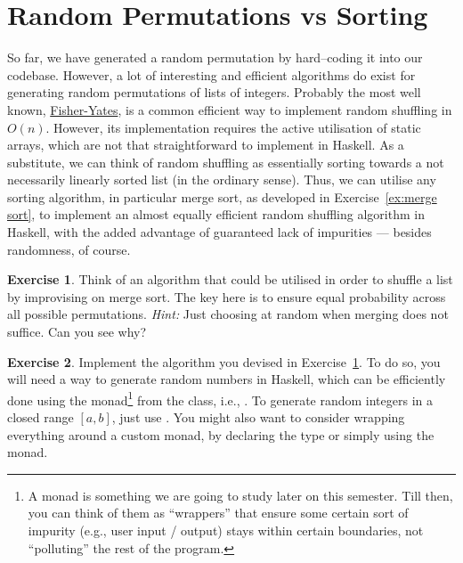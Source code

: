 \documentclass[a4paper]{tufte-handout}
\theoremstyle{definition}
\newtheorem{exercise}{Exercise}
\begin{document}
	\section{Random Permutations vs Sorting}
	So far, we have generated a random permutation by hard--coding it into our codebase. However, a lot of interesting and efficient algorithms do exist for generating random permutations of lists of integers. Probably the most well known, \href{https://en.wikipedia.org/wiki/Fisher%E2%80%93Yates_shuffle}{Fisher-Yates}, is a common efficient way to implement random shuffling in $O(n)$. However, its implementation requires the active utilisation of static arrays, which are not that straightforward to implement in Haskell. As a substitute, we can think of random shuffling as essentially sorting towards a not necessarily linearly sorted list (in the ordinary sense). Thus, we can utilise any sorting algorithm, in particular merge sort, as developed in Exercise~\ref{ex:merge sort}, to implement an almost equally efficient random shuffling algorithm in Haskell, with the added advantage of guaranteed lack of impurities --- besides randomness, of course.
	
	\begin{exercise}\label{ex:merge shuffle}
		Think of an algorithm that could be utilised in order to shuffle a list by improvising on merge sort. The key here is to ensure equal probability across all possible permutations. \textit{Hint:} Just choosing at random when merging does not suffice. Can you see why?
	\end{exercise}

	\begin{exercise}
		Implement the algorithm you devised in Exercise~\ref{ex:merge shuffle}. To do so, you will need a way to generate random numbers in Haskell, which can be efficiently done using the  monad\footnote{A monad is something we are going to study later on this semester. Till then, you can think of them as ``wrappers'' that ensure some certain sort of impurity (e.g., user input / output) stays within certain boundaries, not ``polluting'' the rest of the program.} from the  class, i.e., . To generate random integers in a closed range $[a,b]$, just use . You might also want to consider wrapping everything around a custom monad, by declaring the type  or simply using the  monad.
	\end{exercise}
\end{document}
